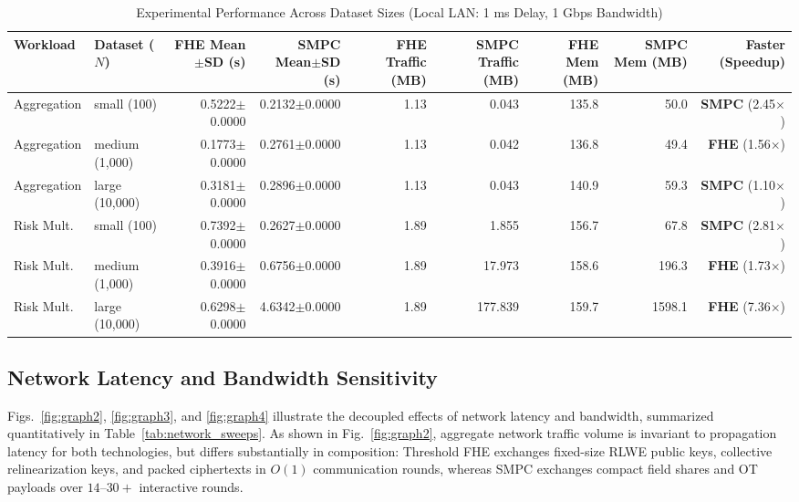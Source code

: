 \documentclass[conference]{IEEEtran}
\begin{document}
\begin{table}[htbp]
\caption{Experimental Performance Across Dataset Sizes (Local LAN: 1 ms Delay, 1 Gbps Bandwidth)}
\label{tab:dataset_scaling}
\centering
\scriptsize
\begin{tabular}{@{}llrrrrrrr@{}}
\toprule
\textbf{Workload} & \textbf{Dataset ($N$)} & \textbf{FHE Mean$\pm$SD (s)} & \textbf{SMPC Mean$\pm$SD (s)} & \textbf{FHE Traffic (MB)} & \textbf{SMPC Traffic (MB)} & \textbf{FHE Mem (MB)} & \textbf{SMPC Mem (MB)} & \textbf{Faster (Speedup)} \\
\midrule
Aggregation & small (100) & 0.5222$\pm$0.0000 & 0.2132$\pm$0.0000 & 1.13 & 0.043 & 135.8 & 50.0 & \textbf{SMPC} (2.45$\times$) \\
Aggregation & medium (1,000) & 0.1773$\pm$0.0000 & 0.2761$\pm$0.0000 & 1.13 & 0.042 & 136.8 & 49.4 & \textbf{FHE} (1.56$\times$) \\
Aggregation & large (10,000) & 0.3181$\pm$0.0000 & 0.2896$\pm$0.0000 & 1.13 & 0.043 & 140.9 & 59.3 & \textbf{SMPC} (1.10$\times$) \\
Risk Mult. & small (100) & 0.7392$\pm$0.0000 & 0.2627$\pm$0.0000 & 1.89 & 1.855 & 156.7 & 67.8 & \textbf{SMPC} (2.81$\times$) \\
Risk Mult. & medium (1,000) & 0.3916$\pm$0.0000 & 0.6756$\pm$0.0000 & 1.89 & 17.973 & 158.6 & 196.3 & \textbf{FHE} (1.73$\times$) \\
Risk Mult. & large (10,000) & 0.6298$\pm$0.0000 & 4.6342$\pm$0.0000 & 1.89 & 177.839 & 159.7 & 1598.1 & \textbf{FHE} (7.36$\times$) \\
\bottomrule
\end{tabular}
\end{table}

\subsection{Network Latency and Bandwidth Sensitivity}
Figs.~\ref{fig:graph2}, \ref{fig:graph3}, and \ref{fig:graph4} illustrate the decoupled effects of network latency and bandwidth, summarized quantitatively in Table~\ref{tab:network_sweeps}. As shown in Fig.~\ref{fig:graph2}, aggregate network traffic volume is invariant to propagation latency for both technologies, but differs substantially in composition: Threshold FHE exchanges fixed-size RLWE public keys, collective relinearization keys, and packed ciphertexts in $O(1)$ communication rounds, whereas SMPC exchanges compact field shares and OT payloads over $14$--$30+$ interactive rounds.
\end{document}
